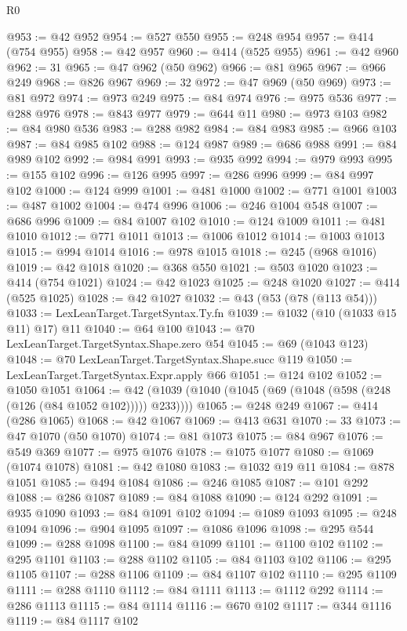 \begin{lexlean}{R0}
\begin{coremodule}
@953 := @42 @952
@954 := @527 @550
@955 := @248 @954
@957 := @414 (@754 @955)
@958 := @42 @957
@960 := @414 (@525 @955)
@961 := @42 @960
@962 := 31
@965 := @47 @962 (@50 @962)
@966 := @81 @965
@967 := @966 @249
@968 := @826 @967
@969 := 32
@972 := @47 @969 (@50 @969)
@973 := @81 @972
@974 := @973 @249
@975 := @84 @974
@976 := @975 @536
@977 := @288 @976
@978 := @843 @977
@979 := @644 @11
@980 := @973 @103
@982 := @84 @980 @536
@983 := @288 @982
@984 := @84 @983
@985 := @966 @103
@987 := @84 @985 @102
@988 := @124 @987
@989 := @686 @988
@991 := @84 @989 @102
@992 := @984 @991
@993 := @935 @992
@994 := @979 @993
@995 := @155 @102
@996 := @126 @995
@997 := @286 @996
@999 := @84 @997 @102
@1000 := @124 @999
@1001 := @481 @1000
@1002 := @771 @1001
@1003 := @487 @1002
@1004 := @474 @996
@1006 := @246 @1004 @548
@1007 := @686 @996
@1009 := @84 @1007 @102
@1010 := @124 @1009
@1011 := @481 @1010
@1012 := @771 @1011
@1013 := @1006 @1012
@1014 := @1003 @1013
@1015 := @994 @1014
@1016 := @978 @1015
@1018 := @245 (@968 @1016)
@1019 := @42 @1018
@1020 := @368 @550
@1021 := @503 @1020
@1023 := @414 (@754 @1021)
@1024 := @42 @1023
@1025 := @248 @1020
@1027 := @414 (@525 @1025)
@1028 := @42 @1027
@1032 := @43 (@53 (@78 (@113 @54)))
@1033 := LexLeanTarget.TargetSyntax.Ty.fn
@1039 := @1032 (@10 (@1033 @15 @11) @17) @11
@1040 := @64 @100
@1043 := @70 LexLeanTarget.TargetSyntax.Shape.zero @54
@1045 := @69 (@1043 @123)
@1048 := @70 LexLeanTarget.TargetSyntax.Shape.succ @119
@1050 := LexLeanTarget.TargetSyntax.Expr.apply @66
@1051 := @124 @102
@1052 := @1050 @1051
@1064 := @42 (@1039 (@1040 (@1045 (@69 (@1048 (@598 (@248 (@126 (@84 @1052 @102))))) @233))))
@1065 := @248 @249
@1067 := @414 (@286 @1065)
@1068 := @42 @1067
@1069 := @413 @631
@1070 := 33
@1073 := @47 @1070 (@50 @1070)
@1074 := @81 @1073
@1075 := @84 @967
@1076 := @549 @369
@1077 := @975 @1076
@1078 := @1075 @1077
@1080 := @1069 (@1074 @1078)
@1081 := @42 @1080
@1083 := @1032 @19 @11
@1084 := @878 @1051
@1085 := @494 @1084
@1086 := @246 @1085
@1087 := @101 @292
@1088 := @286 @1087
@1089 := @84 @1088
@1090 := @124 @292
@1091 := @935 @1090
@1093 := @84 @1091 @102
@1094 := @1089 @1093
@1095 := @248 @1094
@1096 := @904 @1095
@1097 := @1086 @1096
@1098 := @295 @544
@1099 := @288 @1098
@1100 := @84 @1099
@1101 := @1100 @102
@1102 := @295 @1101
@1103 := @288 @1102
@1105 := @84 @1103 @102
@1106 := @295 @1105
@1107 := @288 @1106
@1109 := @84 @1107 @102
@1110 := @295 @1109
@1111 := @288 @1110
@1112 := @84 @1111
@1113 := @1112 @292
@1114 := @286 @1113
@1115 := @84 @1114
@1116 := @670 @102
@1117 := @344 @1116
@1119 := @84 @1117 @102

\end{coremodule}
\end{lexlean}
